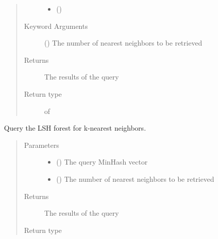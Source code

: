 \documentclass[letterpaper,10pt,english]{sphinxmanual}
\begin{document}
\begin{fulllineitems}
\begin{fulllineitems}
\begin{quote}
\begin{description}
\begin{itemize}
\item {} 
 () \textendash{} 

\end{itemize}

\item[{Keyword Arguments}] \leavevmode
{} () \textendash{} The number of nearest neighbors to be retrieved

\item[{Returns}] \leavevmode
The results of the query

\item[{Return type}] \leavevmode
{} of 

\end{description}\end{quote}

\end{fulllineitems}


\begin{fulllineitems}
\label{\detokenize{documentation:tmap.LSHForest.query}}
Query the LSH forest for k-nearest neighbors.
\begin{quote}\begin{description}
\item[{Parameters}] \leavevmode\begin{itemize}
\item {} 
 () \textendash{} The query MinHash vector

\item {} 
 () \textendash{} The number of nearest neighbors to be retrieved

\end{itemize}

\item[{Returns}] \leavevmode
The results of the query

\item[{Return type}] \leavevmode
{}


\end{description}
\end{quote}
\end{fulllineitems}
\end{fulllineitems}
\end{document}
